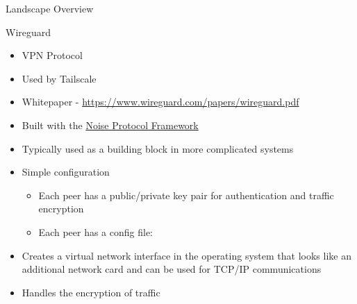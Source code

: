 \begin{frame}[fragile]{Landscape Overview}
\begin{block}{Wireguard}
\protect\hypertarget{wireguard}{}
\begin{itemize}
\tightlist
\item
  VPN Protocol
\item
  Used by Tailscale
\item
  Whitepaper - \url{https://www.wireguard.com/papers/wireguard.pdf}
\item
  Built with the \href{notes/0204-noise}{Noise Protocol Framework}
\item
  Typically used as a building block in more complicated systems
\item
  Simple configuration

  \begin{itemize}
  \item
    Each peer has a public/private key pair for authentication and
    traffic encryption
  \item
    Each peer has a config file:

\begin{Shaded}
\begin{Highlighting}[]
\KeywordTok{[}\KeywordTok{]}
 \OperatorTok{=} \ErrorTok{/}
 \OperatorTok{=} 
 \OperatorTok{=} \OperatorTok{=}

\KeywordTok{[}\KeywordTok{]}
 \OperatorTok{=} \ErrorTok{+}\ErrorTok{+}\ErrorTok{/}\ErrorTok{+}\OperatorTok{=}
 \OperatorTok{=} \ErrorTok{/}
 \OperatorTok{=} \ErrorTok{:}
 \OperatorTok{=} 
\end{Highlighting}
\end{Shaded}
  \end{itemize}
\item
  Creates a virtual network interface in the operating system that looks
  like an additional network card and can be used for TCP/IP
  communications
\item
  Handles the encryption of traffic


\end{itemize}
\end{block}
\end{frame}
